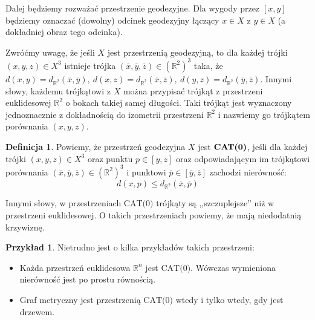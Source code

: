\documentclass[licencjacka]{pracamgr}
\theoremstyle{definition}
\newtheorem{definition}{Definicja}[section]
\theoremstyle{definition}
\theoremstyle{definition}
\newtheorem{example}{Przykład}[section]
\theoremstyle{plain}
\theoremstyle{plain}
\begin{document}
Dalej będziemy rozważać przestrzenie geodezyjne. Dla wygody przez $ [x,y] $ będziemy 
oznaczać (dowolny) odcinek geodezyjny łączący $ x \in X$ z $ y \in X $ (a dokładniej 
obraz tego odcinka).

Zwróćmy uwagę, że jeśli $ X $ jest przestrzenią geodezyjną, to dla każdej trójki 
$ (x,y,z) \in X^3 $ istnieje trójka $ (\overline{x},\overline{y}, \overline{z}) 
\in \left(\mathbb{R}^2\right)^3$ taka, że $ d(x,y) = d_{\mathbb{R}^2} (\overline{x}, 
\overline{y}), ~ d(x,z) = d_{\mathbb{R}^2} (\overline{x}, \overline{z}), 
~ d(y,z) = d_{\mathbb{R}^2} (\overline{y}, \overline{z})  $. Innymi słowy, każdemu 
trójkątowi z $ X $ można przypisać trójkąt z przestrzeni euklidesowej $ \mathbb{R}^2 $ o 
bokach takiej samej długości. Taki trójkąt jest wyznaczony jednoznacznie z dokładnością 
do izometrii przestrzeni $ \mathbb{R}^2 $ i nazwiemy go trójkątem porównania $ (x,y,z) $.

\begin{definition}
	Powiemy, że przestrzeń geodezyjna $ X $ jest $ \text{\textbf{CAT(0)}} $, jeśli 
	dla każdej trójki $ (x,y,z) \in X^3 $ oraz punktu $ p \in [y,z] $ oraz odpowiadającym 
	im trójkątowi porównania $ (\overline{x}, \overline{y}, \overline{z}) \in 
	\left(\mathbb{R}^2\right)^3 $ i punktowi $ \overline{p} \in [\overline{y}, 
	\overline{z}] $ zachodzi nierówność:
	$$ d(x,p) \leq d_{\mathbb{R}^2}(\overline{x}, \overline{p}) $$
\end{definition} 

Innymi słowy, w przestrzeniach $ \text{CAT(0)} $ trójkąty są ,,szczuplejsze'' niż w 
przestrzeni euklidesowej. O takich przestrzeniach powiemy, że mają niedodatnią 
krzywiznę.


\begin{example} Nietrudno jest o kilka przykładów takich przestrzeni:
	\begin{itemize}
	\item Każda przestrzeń euklidesowa $ \mathbb{R}^n $ jest $ \text{CAT(0)} $. Wówczas 
	wymieniona nierówność jest po prostu równością.
	\item Graf metryczny jest przestrzenią $ \text{CAT(0)} $ wtedy i tylko wtedy, gdy 
	jest drzewem.
	\end{itemize}
\end{example}
\end{document}
